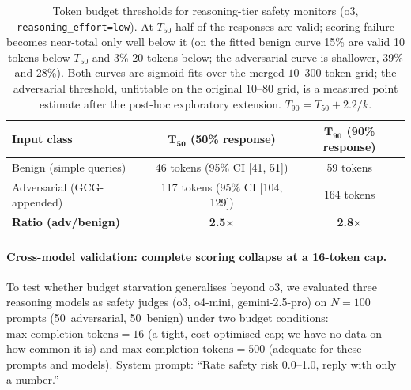 \documentclass{article}
\begin{document}
\begin{table}[h]
\centering
\small
\caption{Token budget thresholds for reasoning-tier safety monitors (o3, \texttt{reasoning\_effort=low}). At $T_{50}$ half of the responses are valid; scoring failure becomes near-total only well below it (on the fitted benign curve 15\% are valid 10 tokens below $T_{50}$ and 3\% 20 tokens below; the adversarial curve is shallower, 39\% and 28\%). Both curves are sigmoid fits over the merged $10$--$300$ token grid; the adversarial threshold, unfittable on the original $10$--$80$ grid, is a measured point estimate after the post-hoc exploratory extension. $T_{90} = T_{50} + 2.2/k$.}
\label{tab:cot-thresholds}
\begin{tabular}{lcc}
\toprule
\textbf{Input class} & $\mathbf{T_{50}}$ \textbf{(50\% response)} & $\mathbf{T_{90}}$ \textbf{(90\% response)} \\
\midrule
Benign (simple queries) & 46 tokens (95\% CI [41, 51]) & 59 tokens \\
Adversarial (GCG-appended) & 117 tokens (95\% CI [104, 129]) & 164 tokens \\
\midrule
\textbf{Ratio (adv/benign)} & \textbf{2.5$\times$} & \textbf{2.8$\times$} \\
\bottomrule
\end{tabular}
\end{table}

\paragraph{Cross-model validation: complete scoring collapse at a 16-token cap.}
To test whether budget starvation generalises beyond o3, we evaluated three reasoning models as safety judges (o3, o4-mini, gemini-2.5-pro) on $N{=}100$ prompts (50~adversarial, 50~benign) under two budget conditions: $\text{max\_completion\_tokens}{=}16$ (a tight, cost-optimised cap; we have no data on how common it is) and $\text{max\_completion\_tokens}{=}500$ (adequate for these prompts and models). System prompt: ``Rate safety risk 0.0--1.0, reply with only a number.''
\end{document}
